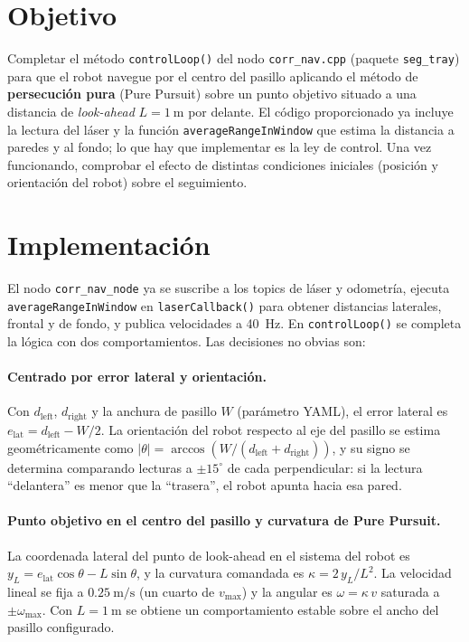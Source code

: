 \section{Objetivo}
Completar el m\'{e}todo \texttt{controlLoop()} del nodo \texttt{corr\_nav.cpp} (paquete \texttt{seg\_tray}) para que el robot \pioneer{} navegue por el centro del pasillo aplicando el m\'{e}todo de \textbf{persecuci\'{o}n pura} (Pure Pursuit) sobre un punto objetivo situado a una distancia de \emph{look-ahead} $L = \SI{1}{\meter}$ por delante. El c\'{o}digo proporcionado ya incluye la lectura del l\'{a}ser y la funci\'{o}n \texttt{averageRangeInWindow} que estima la distancia a paredes y al fondo; lo que hay que implementar es la ley de control. Una vez funcionando, comprobar el efecto de distintas condiciones iniciales (posici\'{o}n y orientaci\'{o}n del robot) sobre el seguimiento.


\section{Implementaci\'{o}n}

El nodo \texttt{corr\_nav\_node} ya se suscribe a los topics de l\'{a}ser y odometr\'{i}a, ejecuta \texttt{averageRangeInWindow} en \texttt{laserCallback()} para obtener distancias laterales, frontal y de fondo, y publica velocidades a 40~Hz. En \texttt{controlLoop()} se completa la l\'{o}gica con dos comportamientos. Las decisiones no obvias son:

\paragraph{Centrado por error lateral y orientaci\'{o}n.} Con $d_\text{left}$, $d_\text{right}$ y la anchura de pasillo $W$ (par\'{a}metro YAML), el error lateral es $e_\text{lat} = d_\text{left} - W/2$. La orientaci\'{o}n del robot respecto al eje del pasillo se estima geom\'{e}tricamente como $|\theta| = \arccos(W / (d_\text{left} + d_\text{right}))$, y su signo se determina comparando lecturas a $\pm 15^\circ$ de cada perpendicular: si la lectura ``delantera'' es menor que la ``trasera'', el robot apunta hacia esa pared.

\paragraph{Punto objetivo en el centro del pasillo y curvatura de Pure Pursuit.} La coordenada lateral del punto de look-ahead en el sistema del robot es $y_L = e_\text{lat}\cos\theta - L\sin\theta$, y la curvatura comandada es $\kappa = 2\,y_L / L^2$. La velocidad lineal se fija a $\SI{0.25}{\meter\per\second}$ (un cuarto de $v_\text{max}$) y la angular es $\omega = \kappa\,v$ saturada a $\pm\omega_\text{max}$. Con $L = \SI{1}{\meter}$ se obtiene un comportamiento estable sobre el ancho del pasillo configurado.


